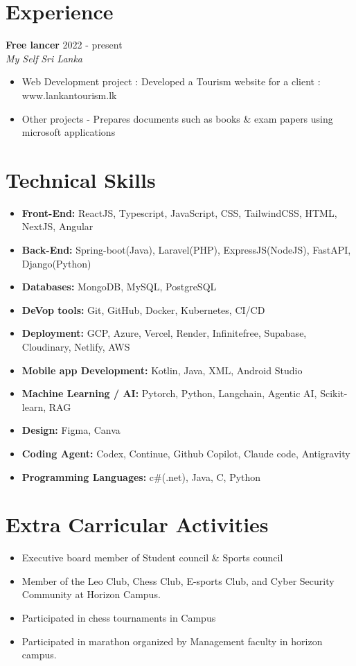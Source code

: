 \documentclass[10pt,a4paper]{article}
\newcommand{\cventry}[4]{%
  \textbf{#1} \hfill #2\\
  \textit{#3} \hfill \textit{#4}\vspace{1pt}}
\begin{document}
\section{Experience}
\cventry{Free lancer}{2022 - present}{My Self}{Sri Lanka}
\begin{itemize}
  \item Web Development project : Developed a Tourism website for a client : www.lankantourism.lk
  \item Other projects - Prepares documents such as books \& exam papers using microsoft applications
\end{itemize}

\section{Technical Skills}
\begin{itemize}[leftmargin=2pt, label={}, itemsep=2pt]
  \item \textbf{Front-End:} ReactJS, Typescript, JavaScript, CSS, TailwindCSS, HTML, NextJS, Angular
  \item \textbf{Back-End:} Spring-boot(Java), Laravel(PHP), ExpressJS(NodeJS), FastAPI, Django(Python)
  \item \textbf{Databases:} MongoDB, MySQL, PostgreSQL
  \item \textbf{DeVop tools:} Git, GitHub, Docker, Kubernetes, CI/CD
  \item \textbf{Deployment:} GCP, Azure, Vercel, Render, Infinitefree, Supabase, Cloudinary, Netlify, AWS
  \item \textbf{Mobile app Development:} Kotlin, Java, XML, Android Studio
  \item \textbf{Machine Learning / AI:} Pytorch, Python, Langchain, Agentic AI, Scikit-learn, RAG
  \item \textbf{Design: }Figma, Canva
  \item \textbf{Coding Agent: } Codex, Continue, Github Copilot, Claude code, Antigravity
  \item \textbf{Programming Languages:} c\#(.net), Java, C, Python
\end{itemize}

\section{Extra Carricular Activities}
\begin{itemize}
  \item Executive board member of Student council \& Sports council
  \item Member of the Leo Club, Chess Club, E-sports Club, and Cyber Security Community at Horizon Campus.
  \item Participated in chess tournaments in Campus
  \item Participated in marathon organized by Management faculty in horizon campus.
\end{itemize}
\end{document}

